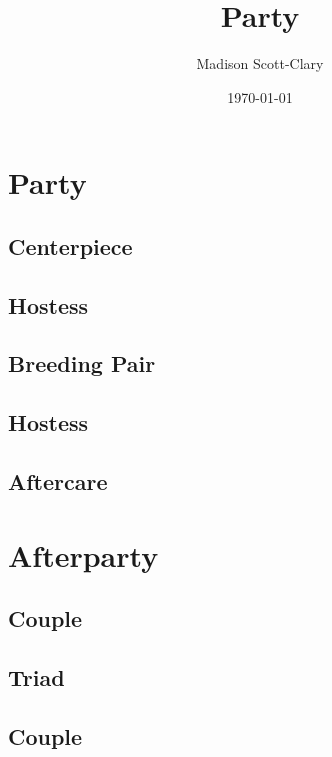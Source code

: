 \documentclass[12pt,letterpaper,oneside]{memoir}
\title{Party}
\author{Madison Scott-Clary}
\date{\today}
\begin{document}
  \maketitle

  \newpage
  \tableofcontents*

  \part{Party}

  \chapter{Centerpiece}
  

  \chapter{Hostess}
  

  \chapter{Breeding Pair}
  

  \chapter{Hostess}
  

  \chapter{Aftercare}
  

  \part{Afterparty}

  \chapter{Couple}
  

  \chapter{Triad}
  

  \chapter{Couple}
  
\end{document}
